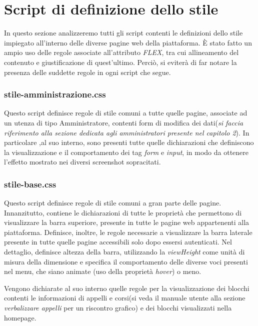 \documentclass [a4paper,11pt]{book}
\begin{document}
\medskip

\section{Script di definizione dello stile}

In questo sezione analizzeremo tutti gli script contenti le definizioni dello stile impiegato all'interno delle diverse pagine web della piattaforma. È stato fatto un ampio uso delle regole associate all'attributo \emph{FLEX}, tra cui allineamento del contenuto e giustificazione di quest'ultimo. Perciò, si eviterà  di far notare la presenza delle suddette regole in ogni script che segue. 

\medskip

\subsubsection{stile-amministrazione.css}

Questo script definisce regole di stile comuni a tutte quelle pagine, associate ad un utenza di tipo Amministratore, contenti form di modifica dei dati(\emph{si faccia riferimento alla sezione dedicata agli amministratori presente nel capitolo 2}).
In particolare ,al suo interno, sono presenti tutte quelle dichiarazioni che definiscono la visualizzazione e il comportamento dei tag \emph{form} e \emph{input}, in modo da ottenere l'effetto mostrato nei diversi screenshot sopracitati. 

\medskip

\subsubsection{stile-base.css}

Questo script definisce regole di stile comuni a gran parte delle pagine. 
Innanzitutto, contiene le dichiarazioni di tutte le proprietà che permettono di visualizzare la barra superiore, presente in tutte le pagine web appartenenti alla piattaforma. 
Definisce, inoltre, le regole necessarie a visualizzare la barra laterale presente in tutte quelle pagine accessibili solo dopo essersi autenticati. Nel dettaglio, definisce altezza della barra, utilizzando la \emph{viewHeight} come unità di misura della dimensione e specifica il comportamento delle diverse voci presenti nel menu, che siano animate (uso della proprietà \emph{hover}) o meno.

Vengono dichiarate al suo interno quelle regole per la visualizzazione dei blocchi contenti le informazioni di appelli e corsi(si veda il manuale utente alla sezione \emph{verbalizzare appelli} per un riscontro grafico) e dei blocchi visualizzati nella homepage.
\end{document}
